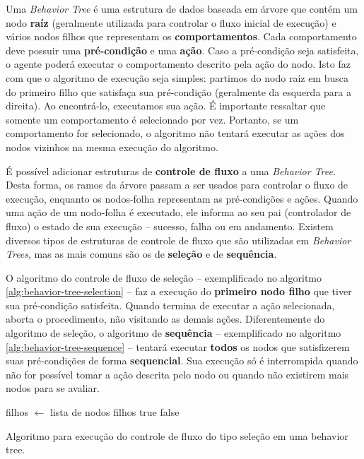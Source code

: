 Uma \textit{Behavior Tree} é uma estrutura de dados baseada em árvore que contém
um nodo \textbf{raíz} (geralmente utilizada para controlar o fluxo inicial de
execução) e vários nodos filhos que representam os \textbf{comportamentos}. Cada
comportamento deve possuir uma \textbf{pré-condição} e uma \textbf{ação}. Caso a
pré-condição seja satisfeita, o agente poderá executar o comportamento descrito
pela ação do nodo\cite[Cap. 4]{Rabin:2013:GAP:2566761}. Isto faz com que o
algoritmo de execução seja simples: partimos do nodo raíz em busca do primeiro
filho que satisfaça sua pré-condição (geralmente da esquerda para a direita). Ao
encontrá-lo, executamos sua ação. É importante ressaltar que somente um
comportamento é selecionado por vez. Portanto, se um comportamento for
selecionado, o algoritmo não tentará executar as ações dos nodos vizinhos na
mesma execução do algoritmo.

É possível adicionar estruturas de \textbf{controle de fluxo} a uma
\textit{Behavior Tree}. Desta forma, os ramos da árvore passam a ser usados para
controlar o fluxo de execução, enquanto os nodos-folha representam as
pré-condições e ações\cite[Cap. 10]{Rabin:2015:GAP:2821138}. Quando uma ação de
um nodo-folha é executado, ele informa ao seu pai (controlador de fluxo) o
estado de sua execução -- sucesso, falha ou em andamento. Existem diversos
tipos de estruturas de controle de fluxo que são utilizadas em \textit{Behavior
Trees}, mas as mais comuns são os de \textbf{seleção} e de \textbf{sequência}.

O algoritmo do controle de fluxo de seleção -- exemplificado no algoritmo
\ref{alg:behavior-tree-selection} -- faz a execução do \textbf{primeiro nodo
filho} que tiver sua pré-condição satisfeita. Quando termina de executar a ação
selecionada, aborta o procedimento, não visitando as demais ações.
Diferentemente do algoritmo de seleção, o algoritmo de \textbf{sequência} --
exemplificado no algoritmo \ref{alg:behavior-tree-sequence} -- tentará executar
\textbf{todos} os nodos que satisfizerem suas pré-condições de forma
\textbf{sequencial}. Sua execução só é interrompida quando não for possível
tomar a ação descrita pelo nodo ou quando não existirem mais nodos para se
avaliar.

\begin{algorithm}[H]
\begin{center}
	\begin{algorithmic}[1]
        \STATE filhos $\gets$ lista de nodos filhos
                \RETURN true
            \ENDIF
        \ENDFOR
        \RETURN false
    \end{algorithmic}
\end{center}
\caption[Algoritmo para execução do controle de fluxo do tipo seleção em uma
behavior tree.]
{\label{alg:behavior-tree-selection} Algoritmo para execução do controle de
fluxo do tipo seleção em uma behavior tree.}
\end{algorithm}

